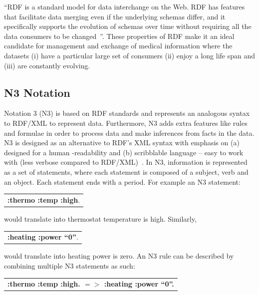 \documentclass[conference]{IEEEtran}
\begin{document}
“RDF is a standard model for data interchange on the Web. RDF has features that facilitate data merging even if the underlying schemas differ, and it
specifically supports the evolution of schemas over time without requiring all the data consumers to be changed~\cite{rdfsite}”.  These properties of RDF make
it an ideal candidate for management and exchange of medical information where the datasets (i) have a particular large set of consumers (ii)
enjoy a long life span and (iii) are constantly evolving.

\subsection{N3 Notation}

Notation 3 (N3) is based on RDF standards and represents an analogous syntax to RDF/XML to represent data.  Furthermore, N3 adds extra features like rules and
formulae in
order to process data and make inferences from facts in the data.  N3 is designed as an alternative to RDF's XML syntax with emphasis on (a) designed for a
human -readability and (b) scribblable language – easy to work with (less verbose compared to RDF/XML)~\cite{notation3}.  In N3, information is represented as a
set of statements, where each statement is composed of a subject, verb and an object. Each statement ends with a period.
For example an N3 statement:

\begin{table}[!h]
\centering
 \begin{tabular}{c}
 \textbf{{:thermo :temp :high}}.\\ 
 \end{tabular}
\end{table}


would translate into thermostat temperature is high. Similarly,

\begin{table}[!h]
\centering
 \begin{tabular}{c}
 \textbf{{:heating :power “0”}}.\\ 
 \end{tabular}
\end{table}

would translate into heating power is zero.  An N3 rule can be described by combining multiple N3 statements as such:

\begin{table}[!h]
\centering
\begin{tabular}{c}
\textbf{{:thermo :temp :high}. $=>$ {:heating :power “0”}.}\\
\end{tabular}
\end{table}
\end{document}
